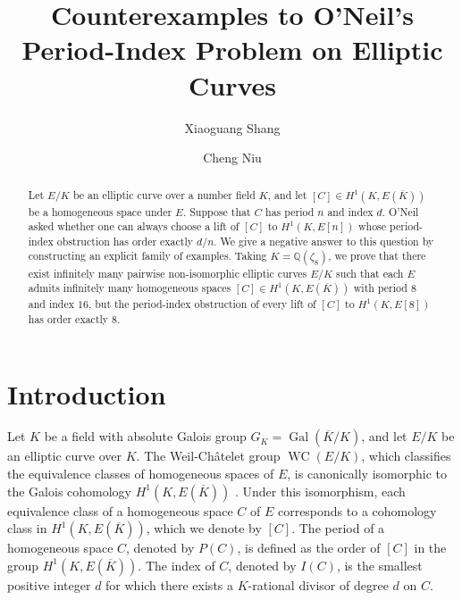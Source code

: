 \documentclass[11pt,a4paper]{amsart}
\title{Counterexamples to O'Neil's Period-Index Problem on Elliptic Curves}
\author{Xiaoguang Shang}
\author{Cheng Niu}
\theoremstyle{definition}
\newcommand{\Gal}{\operatorname{Gal}}
\numberwithin{equation}{section}
\begin{document}
\maketitle

	
\begin{abstract}
Let $E/K$ be an elliptic curve over a number field $K$, and let $[C]\in H^1(K,E(\overline{K}))$ be a homogeneous space under $E$. Suppose that $C$ has period $n$ and index $d$.  O'Neil asked whether one can always choose a
lift of $[C]$ to $H^1(K,E[n])$ whose period-index obstruction has  order exactly
$d/n$.  We give a negative answer to this question by constructing an explicit family of examples.  Taking $K=\mathbb{Q}(\zeta_8)$, we prove that there exist infinitely many pairwise non-isomorphic elliptic
curves $E/K$ such that each $E$ admits infinitely many homogeneous spaces
$[C]\in H^1(K,E(\overline{K}))$ with period $8$ and index $16$, but the period-index
obstruction of every lift of $[C]$ to $H^1(K,E[8])$ has  order exactly $8$.
\end{abstract}

\section{Introduction}


Let $K$ be a field with absolute Galois group $G_K=\Gal(\overline{K}/K)$, and let $E/K$ be an elliptic curve over  $K$.  The Weil-Ch\^{a}telet group $\operatorname{WC}(E/K)$, which classifies the equivalence classes of homogeneous spaces of $E$, is canonically isomorphic to the Galois cohomology $H^1(K,E(\overline{K}))$ \cite[Proposition 4]{LangTate}. Under this isomorphism, each equivalence class of a homogeneous space $C$ of $E$ corresponds to a cohomology class in $H^1(K,E(\overline{K}))$, which we denote by $[C]$. The period of a homogeneous space $C$, denoted by $P(C)$, is defined as  the order of $[C]$ in the group $H^1(K,E(\overline{K}))$. The index of $C$, denoted by $I(C)$, is the smallest positive integer $d$ for which there exists a  $K$-rational divisor of degree $d$ on $C$.
\end{document}
